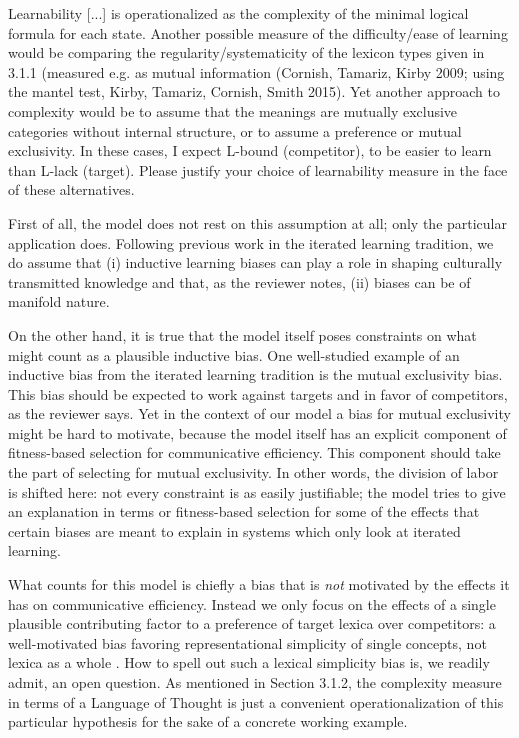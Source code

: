 \documentclass[12pt,a4paper]{article}
\begin{document}
\begin{mdframed}[backgroundcolor=gray!25,linecolor=gray!25]
Learnability [...] is operationalized as the complexity of the minimal logical formula for each state. Another possible measure of the difficulty/ease of learning would be comparing the regularity/systematicity of the lexicon types given in 3.1.1 (measured e.g. as mutual information (Cornish, Tamariz, Kirby 2009; using the mantel test, Kirby, Tamariz, Cornish, Smith 2015). Yet another approach to complexity would be to assume that the meanings are mutually exclusive categories without internal structure, or to assume a preference or mutual exclusivity. In these cases, I expect L-bound (competitor), to be easier to learn than L-lack (target). Please justify your choice of learnability measure in the face of these alternatives.
\end{mdframed}

First of all, the model does not rest on this assumption at all; only the particular application does. Following previous work in the iterated learning tradition, we do assume that (i) inductive learning biases can play a role in shaping culturally transmitted knowledge and that, as the reviewer notes, (ii) biases can be of manifold nature.  

On the other hand, it is true that the model itself poses constraints on what might count as a plausible inductive bias. One well-studied example of an inductive bias from the iterated learning tradition is the mutual exclusivity bias. This bias should be expected to work against targets and in favor of competitors, as the reviewer says. Yet in the context of our model a bias for mutual exclusivity might be hard to motivate, because the model itself has an explicit component of fitness-based selection for communicative efficiency. This component should take the part of selecting for mutual exclusivity. In other words, the division of labor is shifted here: not every constraint is as easily justifiable; the model tries to give an explanation in terms or fitness-based selection for some of the effects that certain biases are meant to explain in systems which only look at iterated learning.

What counts for this model is chiefly a bias that is \emph{not} motivated by the effects it has on communicative efficiency. Instead we only focus on the effects of a single plausible contributing factor to a preference of target lexica over competitors: a well-motivated bias favoring representational simplicity of single concepts, not lexica as a whole \citep{feldman:2000,chater+vitanyi:2003, piantadosi+etal:2012a,kirby+etal:2015,piantadosi+etal:underreview}. How to spell out such a lexical simplicity bias is, we readily admit, an open question. As mentioned in Section 3.1.2, the complexity measure in terms of a Language of Thought is just a convenient operationalization of this particular hypothesis for the sake of a concrete working example. 
\end{document}

